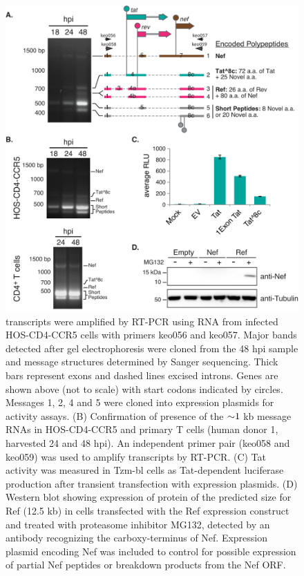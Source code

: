 \documentclass[../sherrill-Mix_thesis.tex]{subfiles}
\begin{document}
\begin{figure}
	\centering
	\includegraphics[width=.9\textwidth]{3.pdf}
	\caption[Novel transcripts utilizing acceptor A8c]{\hivEight{} transcripts were amplified by RT-PCR using RNA from infected HOS-CD4-CCR5 cells with primers keo056 and keo057. Major bands detected after gel electrophoresis were cloned from the 48 hpi sample and message structures determined by Sanger sequencing. Thick bars represent exons and dashed lines excised introns. Genes are shown above (not to scale) with start codons indicated by circles.  Messages 1, 2, 4 and 5 were cloned into expression plasmids for activity assays. (B) Confirmation of presence of the $\mathord{\sim}{}1$ kb message RNAs in HOS-CD4-CCR5 and primary \cdFour{} T cells (human donor 1, harvested 24 and 48 hpi). An independent primer pair (keo058 and keo059) was used to amplify transcripts by RT-PCR. (C) Tat activity was measured in Tzm-bl cells as Tat-dependent luciferase production after transient transfection with expression plasmids. (D) Western blot showing expression of protein of the predicted size for Ref (12.5 kb) in cells transfected with the Ref expression construct and treated with proteasome inhibitor MG132, detected by an antibody recognizing the carboxy-terminus of Nef. Expression plasmid encoding Nef was included to control for possible expression of partial Nef peptides or breakdown products from the Nef ORF.}
	\label{figA8c}
\end{figure}
\end{document}
